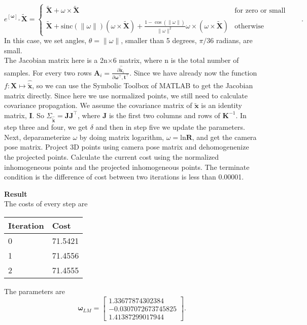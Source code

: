 \documentclass{../../assignment}
\begin{document}
\begin{problemlist}
\begin{enumerate}
$$
e^{[\mathbf{\omega}]_{\times}}\mathbf{\widetilde{X}} =
\begin{cases}
\mathbf{\widetilde{X}} + \omega \times \mathbf{\widetilde{X}} &
\text{for zero or small rotations}\\\\
\mathbf{\widetilde{X}} + \mathrm{sinc}(\|\omega\|)(\omega \times \mathbf{\widetilde{X}}) + \frac{1-\cos(\|\omega\|)}{\|\omega\|^2} \omega \times (\omega \times \mathbf{\widetilde{X}}) &
\text{otherwise}
\end{cases}.
$$
In this case, we set angles, $\theta = \|\omega\|$, smaller than 5 degrees, $\pi /36$ radians, are small.\\
The Jacobian matrix here is a 2n$\times$6 matrix, where n is the total number of samples. For every two rows
$\mathbf{A}_i = \frac{\partial \mathbf{\hat{\widetilde x}}_i}{\partial \mathbf{\omega^{\top},t^{\top}}}$. Since we have already now the function $f: \mathbf{X}\mapsto \mathbf{\hat{\widetilde x}}$, so we can use the Symbolic Toolbox of MATLAB to get the Jacobian matrix directly. Since here we use normalized points, we still need to calculate covariance propagation. We assume the covariance matrix of $\mathbf{\widetilde x}$ is an identity matrix, $\mathbf{I}$. So $\Sigma_{\mathbf{\hat{\widetilde x}}} = \mathbf{JJ^{\top}}$, where $\mathbf{J}$ is the first two columns and rows of $\mathbf{K}^{-1}$. In step three and four, we get $\delta$ and then in step five we update the parameters. Next, deparameterize $\omega$ by doing matrix logarithm, $\omega = \mathrm{ln} \mathbf{R}$, and get the camera pose matrix. Project 3D points using camera pose matrix and dehomogenenize the projected points. Calculate the current cost using the normalized inhomogeneous points and the projected inhomogeneous points. The terminate condition is the difference of cost between two iterations is less than 0.00001.








\textbf{Result}\\
The costs of every step are
\begin{center}  
\begin{tabular}{|l|l|}
\hline
Iteration&Cost\\
\hline
0&71.5421\\
\hline 
1&71.4556\\
\hline 
2&71.4555\\
\hline 
\end{tabular}
\end{center}
The parameters are
\[
\mathbf{\omega}_{LM} = 
\begin{bmatrix}
1.33677874302384\\
-0.0307072673745825\\
1.41387299017944
\end{bmatrix}.
\]




\end{enumerate}
\end{problemlist}
\end{document}
